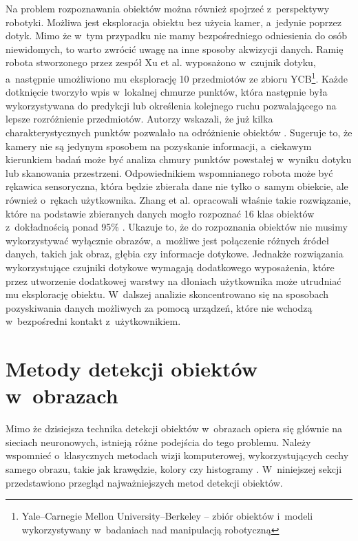 Na problem rozpoznawania obiektów można również spojrzeć z~perspektywy robotyki. Możliwa jest eksploracja obiektu bez użycia kamer, a~jedynie poprzez dotyk. Mimo że w~tym przypadku nie mamy bezpośredniego odniesienia do osób niewidomych, to warto zwrócić uwagę na inne sposoby akwizycji danych. Ramię robota stworzonego przez zespół Xu et al. wyposażono w~czujnik dotyku, a~następnie umożliwiono mu eksplorację 10 przedmiotów ze zbioru YCB\footnote{Yale--Carnegie Mellon University--Berkeley -- zbiór obiektów i~modeli wykorzystywany w~badaniach nad manipulacją robotyczną}. Każde dotknięcie tworzyło wpis w~lokalnej chmurze punktów, która następnie była wykorzystywana do predykcji lub określenia kolejnego ruchu pozwalającego na lepsze rozróżnienie przedmiotów. Autorzy wskazali, że już kilka charakterystycznych punktów pozwalało na odróżnienie obiektów \cite{bib:xu2023tandem3dactivetactileexploration}. Sugeruje to, że kamery nie są jedynym sposobem na pozyskanie informacji, a~ciekawym kierunkiem badań może być analiza chmury punktów powstałej w~wyniku dotyku lub skanowania przestrzeni. Odpowiednikiem wspomnianego robota może być rękawica sensoryczna, która będzie zbierała dane nie tylko o~samym obiekcie, ale również o~rękach użytkownika. Zhang et al. opracowali właśnie takie rozwiązanie, które na podstawie zbieranych danych mogło rozpoznać 16 klas obiektów z~dokładnością ponad 95\% \cite{bib:ZHANG2025}. Ukazuje to, że do rozpoznania obiektów nie musimy wykorzystywać wyłącznie obrazów, a~możliwe jest połączenie różnych źródeł danych, takich jak obraz, głębia czy informacje dotykowe. Jednakże rozwiązania wykorzystujące czujniki dotykowe wymagają dodatkowego wyposażenia, które przez utworzenie dodatkowej warstwy na dłoniach użytkownika może utrudniać mu eksplorację obiektu. W~dalszej analizie skoncentrowano się na sposobach pozyskiwania danych możliwych za pomocą urządzeń, które nie wchodzą w~bezpośredni kontakt z~użytkownikiem.

\section{Metody detekcji obiektów w~obrazach}

Mimo że dzisiejsza technika detekcji obiektów w~obrazach opiera się głównie na sieciach neuronowych, istnieją różne podejścia do tego problemu. Należy wspomnieć o~klasycznych metodach wizji komputerowej, wykorzystujących cechy samego obrazu, takie jak krawędzie, kolory czy histogramy \cite{bib:zou2023objectdetection}. W~niniejszej sekcji przedstawiono przegląd najważniejszych metod detekcji obiektów.

